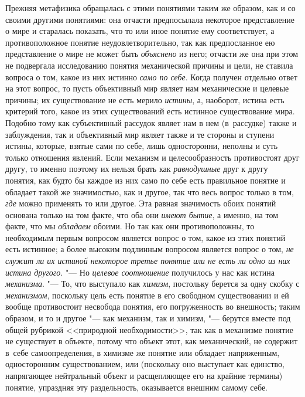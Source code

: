 Прежняя метафизика обращалась с этими понятиями таким же
образом, как и со своими другими понятиями: она отчасти предпосылала
некоторое представление о мире и старалась показать, что то или иное
понятие ему соответствует, а противоположное понятие неудовлетворительно,
так как предпосланное ею представление о мире не может быть
{\em объяснено} из него;
отчасти же она при этом не подвергала исследованию понятия механической
причины и цели, не ставила вопроса о том, какое из них истинно
{\em само по себе}. Когда
получен отдельно ответ на этот вопрос, то пусть объективный мир являет нам
механические и целевые причины; их существование не есть мерило
{\em истины}, а,
наоборот, истина есть критерий того, какое из этих существований есть
истинное существование мира. Подобно тому как субъективный рассудок являет
нам в нем (в~рассудке) также и заблуждения, так и объективный мир являет
также и те стороны и ступени истины, которые, взятые сами по себе, лишь
односторонни, неполны и суть только отношения явлений. Если механизм и
целесообразность противостоят друг другу, то именно поэтому их нельзя брать
как {\em равнодушные}
друг к другу понятия, как будто бы каждое из них само по себе
есть правильное понятие и обладает такой же значимостью, как и другое, так
что весь вопрос только в том, {\em где}
можно применять то или другое. Эта равная
значимость обоих понятий основана только на том факте, что
оба они {\em имеют бытие},
а именно, на том факте, что мы
{\em обладаем} обоими. Но
так как они противоположны, то необходимым первым вопросом является вопрос
о том, какое из этих понятий есть истинное; а более высоким подлинным
вопросом является вопрос о том, {\em не
служит ли их истиной некоторое третье понятие или не есть ли одно из них
истина другого}. "--- Но
{\em целевое соотношение}
получилось у нас как истина
{\em механизма}. "--- То,
что выступало как {\em химизм},
постольку берется за одну скобку с
{\em механизмом},
поскольку цель есть понятие в его свободном существовании и
ей вообще противостоит несвобода понятия, его погруженность во внешность;
таким образом, и то и другое "--- как механизм, так и химизм,
"--- берутся вместе под общей рубрикой <<природной
необходимости>>, так как в механизме понятие не существует в объекте, потому
что объект этот, как механический, не содержит в~себе самоопределения, в
химизме же понятие или обладает напряженным, односторонним существованием,
или (поскольку оно выступает как единство, напрягающее нейтральный объект и
расщепляющее его на крайние термины) понятие, упраздняя эту раздельность,
оказывается внешним самому себе.

